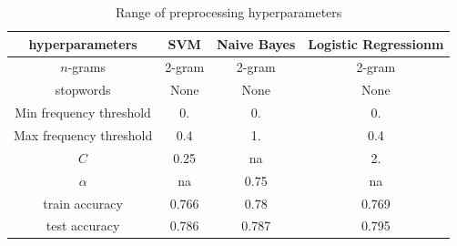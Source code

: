 \documentclass[10pt]{article}
\begin{document}
\begin{table}[h!]
    \centering
    \begin{tabular}{ |c|c|c|c| } 
        \hline
        hyperparameters & SVM &		Naive Bayes &		Logistic Regressionm	\\
        \hline
        $n$-grams 	&	2-gram 	&	2-gram	&	2-gram 	\\
        stopwords 	&	None	&	None	&	None	\\
        Min frequency threshold 	&	0.	&	0.	&	0.	\\
        Max frequency threshold 	&	0.4	&	1.	&	0.4	\\
        $C$	&	0.25	&	na & 2.			\\
        $\alpha$	&	na	&	0.75 & na \\			
        train accuracy 	&	0.766	&	0.78	&	0.769	\\
        test accuracy 	&	0.786	&	0.787	&	0.795	\\
        \hline
    \end{tabular}
    \caption{Range of preprocessing hyperparameters}
    \label{table:result}
\end{table} 
\end{document}
